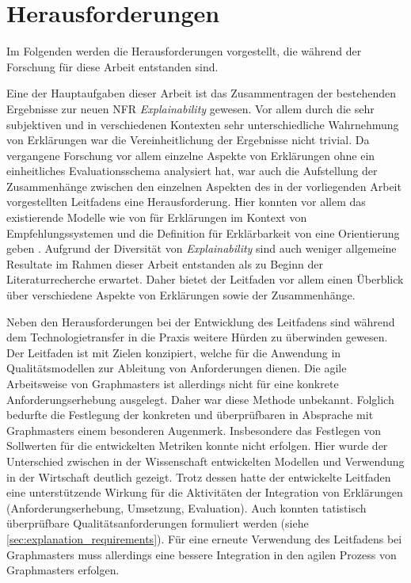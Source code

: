 \section{Herausforderungen}

Im Folgenden werden die Herausforderungen vorgestellt, die während der Forschung für diese Arbeit entstanden sind.

Eine der Hauptaufgaben dieser Arbeit ist das Zusammentragen der bestehenden Ergebnisse zur neuen NFR \textit{Explainability} gewesen. Vor allem durch die sehr subjektiven und in verschiedenen Kontexten sehr unterschiedliche Wahrnehmung von Erklärungen war die Vereinheitlichung der Ergebnisse nicht trivial. Da vergangene Forschung vor allem einzelne Aspekte von Erklärungen ohne ein einheitliches Evaluationsschema analysiert hat, war auch die Aufstellung der Zusammenhänge zwischen den einzelnen Aspekten des in der vorliegenden Arbeit vorgestellten Leitfadens eine Herausforderung. Hier konnten vor allem das existierende Modelle wie von \citeauthor{nunes_systematic_2017} für Erklärungen im Kontext von Empfehlungssystemen und die Definition für Erklärbarkeit von \citeauthor{chazette_knowledge_nodate} eine Orientierung geben \cite{nunes_systematic_2017, chazette_knowledge_nodate}. Aufgrund der Diversität von \textit{Explainability} sind auch weniger allgemeine Resultate im Rahmen dieser Arbeit entstanden als zu Beginn der Literaturrecherche erwartet. Daher bietet der Leitfaden vor allem einen Überblick über verschiedene Aspekte von Erklärungen sowie der Zusammenhänge.

Neben den Herausforderungen bei der Entwicklung des Leitfadens sind während dem Technologietransfer in die Praxis weitere Hürden zu überwinden gewesen. Der Leitfaden ist mit Zielen konzipiert, welche für die Anwendung in Qualitätsmodellen zur Ableitung von Anforderungen dienen. Die agile Arbeitsweise von Graphmasters ist allerdings nicht für eine konkrete Anforderungserhebung ausgelegt. Daher war diese Methode unbekannt. Folglich bedurfte die Festlegung der konkreten und überprüfbaren in Absprache mit Graphmasters einem besonderen Augenmerk. Insbesondere das Festlegen von Sollwerten für die entwickelten Metriken konnte nicht erfolgen. Hier wurde der Unterschied zwischen in der Wissenschaft entwickelten Modellen und Verwendung in der Wirtschaft deutlich gezeigt. Trotz dessen hatte der entwickelte Leitfaden eine unterstützende Wirkung für die Aktivitäten der Integration von Erklärungen (Anforderungserhebung, Umsetzung, Evaluation). Auch konnten tatistisch überprüfbare Qualitätsanforderungen formuliert werden (siehe \autoref{sec:explanation_requirements}). Für eine erneute Verwendung des Leitfadens bei Graphmasters muss allerdings eine bessere Integration in den agilen Prozess von Graphmasters erfolgen.